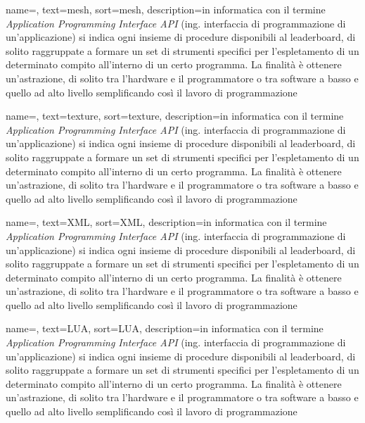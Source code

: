{
	name=,
	text=mesh,
	sort=mesh,
	description={in informatica con il termine \emph{Application Programming Interface API} (ing. interfaccia di programmazione di un'applicazione) si indica ogni insieme di procedure disponibili al leaderboard, di solito raggruppate a formare un set di strumenti specifici per l'espletamento di un determinato compito all'interno di un certo programma. La finalità è ottenere un'astrazione, di solito tra l'hardware e il programmatore o tra software a basso e quello ad alto livello semplificando così il lavoro di programmazione}
}

{
	name=,
	text=texture,
	sort=texture,
	description={in informatica con il termine \emph{Application Programming Interface API} (ing. interfaccia di programmazione di un'applicazione) si indica ogni insieme di procedure disponibili al leaderboard, di solito raggruppate a formare un set di strumenti specifici per l'espletamento di un determinato compito all'interno di un certo programma. La finalità è ottenere un'astrazione, di solito tra l'hardware e il programmatore o tra software a basso e quello ad alto livello semplificando così il lavoro di programmazione}
}

{
	name=,
	text=XML,
	sort=XML,
	description={in informatica con il termine \emph{Application Programming Interface API} (ing. interfaccia di programmazione di un'applicazione) si indica ogni insieme di procedure disponibili al leaderboard, di solito raggruppate a formare un set di strumenti specifici per l'espletamento di un determinato compito all'interno di un certo programma. La finalità è ottenere un'astrazione, di solito tra l'hardware e il programmatore o tra software a basso e quello ad alto livello semplificando così il lavoro di programmazione}
}

{
	name=,
	text=LUA,
	sort=LUA,
	description={in informatica con il termine \emph{Application Programming Interface API} (ing. interfaccia di programmazione di un'applicazione) si indica ogni insieme di procedure disponibili al leaderboard, di solito raggruppate a formare un set di strumenti specifici per l'espletamento di un determinato compito all'interno di un certo programma. La finalità è ottenere un'astrazione, di solito tra l'hardware e il programmatore o tra software a basso e quello ad alto livello semplificando così il lavoro di programmazione}
}

